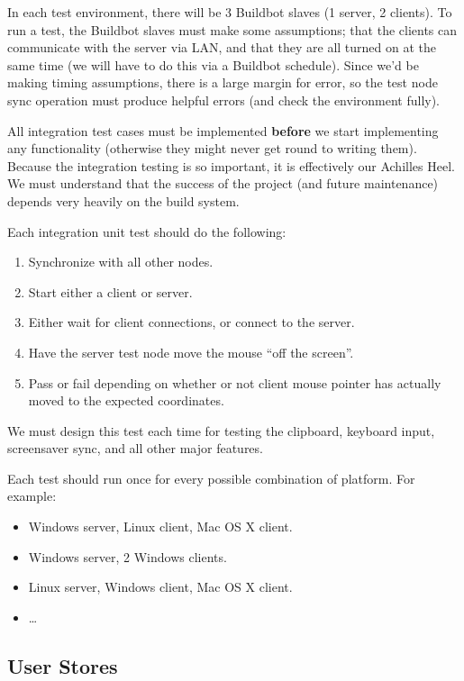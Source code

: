 In each test environment, there will be 3 Buildbot slaves (1 server, 2 clients).
To run a test, the Buildbot slaves must make some assumptions; that the clients
can communicate with the server via LAN, and that they are all turned on at the 
same time (we will have to do this via a Buildbot schedule). Since we'd be 
making timing assumptions, there is a large margin for error, so the test node
sync operation must produce helpful errors (and check the environment fully).

All integration test cases must be implemented \textbf{before} we start 
implementing any functionality (otherwise they might never get round to writing
them). Because the integration testing is so important, it is effectively our 
Achilles Heel. We must understand that the success of the project (and future 
maintenance) depends very heavily on the build system.

Each integration unit test should do the following:

\begin{enumerate}
  \item Synchronize with all other nodes.
  \item Start either a client or server.
  \item Either wait for client connections, or connect to the server.
  \item Have the server test node move the mouse ``off the screen''.
  \item Pass or fail depending on whether or not client mouse pointer has
    actually moved to the expected coordinates.
\end{enumerate}

We must design this test each time for testing the clipboard, keyboard input,
screensaver sync, and all other major features.

Each test should run once for every possible combination of platform. For 
example:

\begin{itemize}
  \item Windows server, Linux client, Mac OS X client.
  \item Windows server, 2 Windows clients.
  \item Linux server, Windows client, Mac OS X client.
  \item \ldots
\end{itemize}

\subsection{User Stores}


